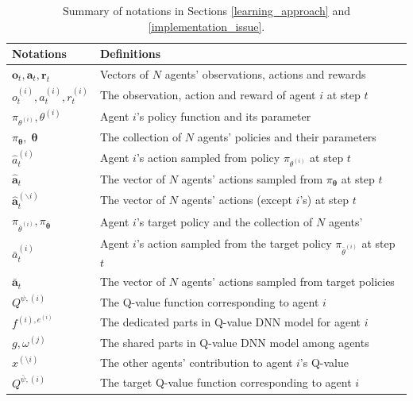 \begin{table}[!t]

\scriptsize
    \caption{\small Summary of notations in Sections \ref{learning_approach} and \ref{implementation_issue}.}
    \label{notation_2}
    \centering
    \begin{tabular}{@{\hspace{1pt}} l @{\hspace{1pt}} l}
        \toprule
        Notations & Definitions \\
        \midrule
        $\mathbf{o}_t,\mathbf{a}_t,\mathbf{r}_t$ & Vectors of $N$ agents' observations, actions and rewards\\
        $o^{(i)}_t,a^{(i)}_t,r^{(i)}_t$ & The observation, action and reward of agent $i$ at step $t$\\
        $\pi_{\theta^{(i)}},\theta^{(i)}$ & Agent $i$'s policy function and its parameter\\
        $\pi_{\boldsymbol{\uptheta}},\boldsymbol{\uptheta}$ & The collection of $N$ agents' policies and their parameters\\
        $\hat{a}^{(i)}_t$ & Agent $i$'s action sampled from policy $\pi_{\theta^{(i)}}$ at step $t$\\
        $\mathbf{\hat{a}}_t$ & The vector of $N$ agents' actions sampled from $\pi_{\boldsymbol{\uptheta}}$ at step $t$\\
        $\mathbf{\hat{a}}^{(\backslash i)}_t$ & The vector of $N$ agents' actions (except $i$'s) at step $t$\\
        $\pi_{\bar{\theta}^{(i)}},\pi_{\boldsymbol{\bar{\uptheta}}}$ & Agent $i$'s target policy and the collection of $N$ agents'\\
        $\bar{a}^{(i)}_t$ & Agent $i$'s action sampled from the target policy $\pi_{\bar{\theta}^{(i)}}$ at step $t$\\
        $\mathbf{\bar{a}}_t$ & The vector of $N$ agents' actions sampled from target policies\\
        $Q^{\psi,(i)}$ & The Q-value function corresponding to agent $i$\\
        $f^{(i),e^{(i)}}$ & The dedicated parts in Q-value DNN model for agent $i$\\
        $g,\omega^{(j)}$ & The shared parts in Q-value DNN model among agents\\
        $x^{(\setminus i)}$ & The other agents' contribution to agent $i$'s Q-value\\
        $Q^{\bar{\psi},(i)}$ & The target Q-value function corresponding to agent $i$\\

\end{tabular}
\end{table}
